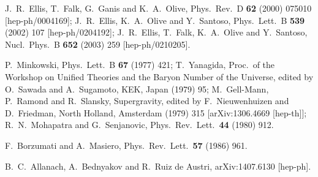 \documentclass[final,3p,11pt,pdflatex]{elsarticle}
\newcommand{\ptitle}[1]{\emph{#1}}
\renewcommand{\ptitle}[1]{}
\begin{document}
\begin{thebibliography}{100}
  J.~R.~Ellis, T.~Falk, G.~Ganis and K.~A.~Olive,
  Phys.\ Rev.\ D {\bf 62} (2000) 075010
  [hep-ph/0004169];
%
  J.~R.~Ellis, K.~A.~Olive and Y.~Santoso,
  Phys.\ Lett.\ B {\bf 539} (2002) 107
  [hep-ph/0204192];
  J.~R.~Ellis, T.~Falk, K.~A.~Olive and Y.~Santoso,
  Nucl.\ Phys.\ B {\bf 652} (2003) 259
  [hep-ph/0210205].

  P.~Minkowski, \ptitle{
  $\mu \rightarrow e \gamma$ at a Rate of One Out of 1-Billion Muon Decays?,}
  Phys.\ Lett.\ B {\bf 67} (1977) 421;
  T.~Yanagida, \ptitle{
  Horizontal Symmetry And Masses Of Neutrinos,}
  Proc.\ of the
  Workshop on Unified Theories and the Baryon Number of the Universe,
  edited by O.~Sawada and A.~Sugamoto, KEK, Japan (1979) 95;
  M.~Gell-Mann, P.~Ramond and R.~Slansky, \ptitle{
  Complex Spinors and Unified Theories,}
  Supergravity, edited by F.~Nieuwenhuizen and
  D.~Friedman, North Holland, Amsterdam (1979) 315
  [arXiv:1306.4669 [hep-th]];
  R.~N.~Mohapatra and G.~Senjanovic, \ptitle{
  Neutrino Mass and Spontaneous Parity Nonconservation,}
  Phys.\ Rev.\ Lett.\  {\bf 44} (1980) 912.

  F.~Borzumati and A.~Masiero, \ptitle{
Large Muon- and electron-Number Nonconservation in Supergravity Theories,}
  Phys.\ Rev.\ Lett.\  {\bf 57} (1986) 961.

  B.~C.~Allanach, A.~Bednyakov and R.~Ruiz de Austri,
  arXiv:1407.6130 [hep-ph].


\end{thebibliography}
\end{document}
